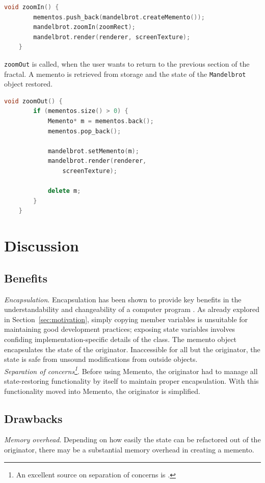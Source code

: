 \documentclass[11pt, a4paper, twoside]{article}
\begin{document}
	\begin{lstlisting}[language=c++, caption={Main.cpp}]
	void zoomIn() {
		mementos.push_back(mandelbrot.createMemento());
		mandelbrot.zoomIn(zoomRect);
		mandelbrot.render(renderer, screenTexture);
	}
	\end{lstlisting}
	
	\verb|zoomOut| is called, when the user wants to return to the previous section of the fractal. A memento is retrieved from storage and the state of the \verb|Mandelbrot| object restored.
	
	\begin{lstlisting}[language=c++, caption={Memento.cpp}]
	void zoomOut() {
		if (mementos.size() > 0) {
			Memento* m = mementos.back();
			mementos.pop_back();
			
			mandelbrot.setMemento(m);
			mandelbrot.render(renderer,
				screenTexture);
			
			delete m;
		}
	}
	\end{lstlisting}
	
	\section{Discussion}
	
	\subsection{Benefits}
	\label{sec:benefits}
	\emph{Encapsulation}. Encapsulation has been shown to provide key benefits in the understandability and changeability of a computer program \cite{snyder1986}. As already explored in Section~\ref{sec:motivation}, simply copying member variables is unsuitable for maintaining good development practices; exposing state variables involves confiding implementation-specific details of the class. The memento object encapsulates the state of the originator. Inaccessible for all but the originator, the state is safe from unsound modifications from outside objects. \\
	
	\noindent\emph{Separation of concerns\footnote{An excellent source on separation of concerns is \cite{Huersch95}.}}. Before using Memento, the originator had to manage all state-restoring functionality by itself to maintain proper encapsulation. With this functionality moved into Memento, the originator is simplified.
	
	\subsection{Drawbacks}
	\emph{Memory overhead}. Depending on how easily the state can be refactored out of the originator, there may be a substantial memory overhead in creating a memento. \\
	
\end{document}
